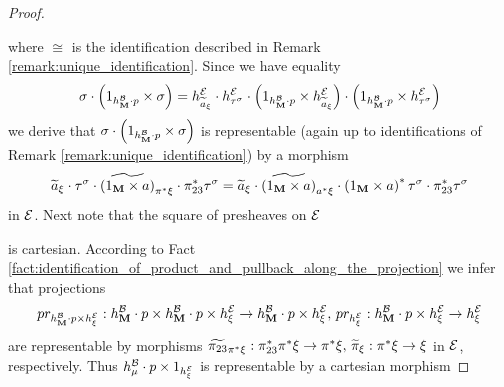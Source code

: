 \begin{proof}
\begin{center}
\end{center}
where $\cong$ is the identification described in Remark \ref{remark:unique_identification}. Since we have equality
$$\sigma \cdot \left(1_{h^{{\mathcal B}}_{\mathbf{M}}\cdot p} \times \sigma \right) = h^{{\mathcal E}}_{\widetilde{a}_{\xi}}\cdot h^{{\mathcal E}}_{\tau^{\sigma}}\cdot \left(1_{h^{{\mathcal B}}_{\mathbf{M}}\cdot p} \times h^{{\mathcal E}}_{\widetilde{a}_{\xi}} \right) \cdot \left(1_{h^{{\mathcal B}}_{\mathbf{M}}\cdot p} \times h^{{\mathcal E}}_{\tau^{\sigma}} \right)$$
we derive that $\sigma \cdot \left(1_{h^{{\mathcal B}}_{\mathbf{M}}\cdot p} \times \sigma \right)$ is representable (again up to identifications of Remark \ref{remark:unique_identification}) by a morphism
$$\widetilde{a}_{\xi}\cdot \tau^{\sigma}\cdot \widetilde{\left(1_{\mathbf{M}}\times a\right)}_{\pi^*\xi}\cdot \pi^*_{23}\tau^\sigma = \widetilde{a}_{\xi} \cdot \widetilde{\left(1_{\mathbf{M}}\times a\right)}_{a^*\xi}\cdot \left(1_{\mathbf{M}}\times a\right)^*\tau^{\sigma}\cdot \pi^*_{23}\tau^\sigma$$
in ${\mathcal E}$. Next note that the square of presheaves on ${\mathcal E}$
\begin{center}
\end{center}
is cartesian. According to Fact \ref{fact:identification_of_product_and_pullback_along_the_projection} we infer that projections $$pr_{h^{{\mathcal B}}_{\mathbf{M}}\cdot p  \times h_{\xi}^{{\mathcal E}}}:h^{{\mathcal B}}_{\mathbf{M}}\cdot p \times h^{{\mathcal B}}_{\mathbf{M}}\cdot p  \times h_{\xi}^{{\mathcal E}} \rightarrow h^{{\mathcal B}}_{\mathbf{M}}\cdot p  \times h_{\xi}^{{\mathcal E}},\,pr_{h^{{\mathcal E}}_{\xi}}:h^{{\mathcal B}}_{\mathbf{M}}\cdot p  \times h_{\xi}^{{\mathcal E}} \rightarrow h_{\xi}^{{\mathcal E}}$$
are representable by morphisms $\widetilde{\pi_{23}}_{\pi^*\xi}:\pi^*_{23}\pi^*\xi \rightarrow \pi^*\xi,\,\widetilde{\pi}_{\xi}:\pi^*\xi\rightarrow \xi$ in ${\mathcal E}$, respectively. Thus $h^{{\mathcal B}}_{\mu}\cdot p \times 1_{h^{{\mathcal E}}_{\xi}}$ is representable by a cartesian morphism

\end{proof}
